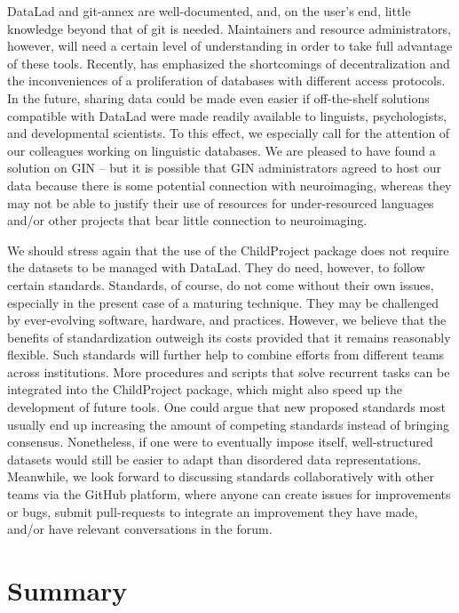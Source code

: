 \documentclass[smallextended]{svjour3}       %
\begin{document}
DataLad and git-annex are well-documented, and, on the user's end, little knowledge beyond that of git is needed. Maintainers and resource administrators, however, will need a certain level of understanding in order to take full advantage of these tools.
Recently, \citet{Powell2021} has emphasized the shortcomings of decentralization and the inconveniences of a proliferation of databases with different access protocols. In the future, sharing data could be made even easier if off-the-shelf solutions compatible with DataLad were made readily available to linguists, psychologists, and developmental scientists. To this effect, we especially call for the attention of our colleagues working on linguistic databases. We are pleased to have found a solution on GIN -- but it is possible that GIN administrators agreed to host our data because there is some potential connection with neuroimaging, whereas they may not be able to justify their use of resources for under-resourced languages and/or other projects that bear little connection to neuroimaging.

We should stress again that the use of the ChildProject package does not require the datasets to be managed with DataLad. They do need, however, to follow certain standards. Standards, of course, do not come without their own issues, especially in the present case of a maturing technique. They may be challenged by ever-evolving software, hardware, and practices. However, we believe that the benefits of standardization outweigh its costs provided that it remains reasonably flexible. Such standards will further help to combine efforts from different teams across institutions. More procedures and scripts that solve recurrent tasks can be integrated into the ChildProject package, which might also speed up the development of future tools. 
One could argue that new proposed standards most usually end up increasing the amount of competing standards instead of bringing consensus. Nonetheless, if one were to eventually impose itself, well-structured datasets would still be easier to adapt than disordered data representations. Meanwhile, we look forward to discussing standards collaboratively with other teams via the GitHub platform, where anyone can create issues for improvements or bugs, submit pull-requests to integrate an improvement they have made, and/or have relevant conversations in the forum.

\section{Summary}
\end{document}
